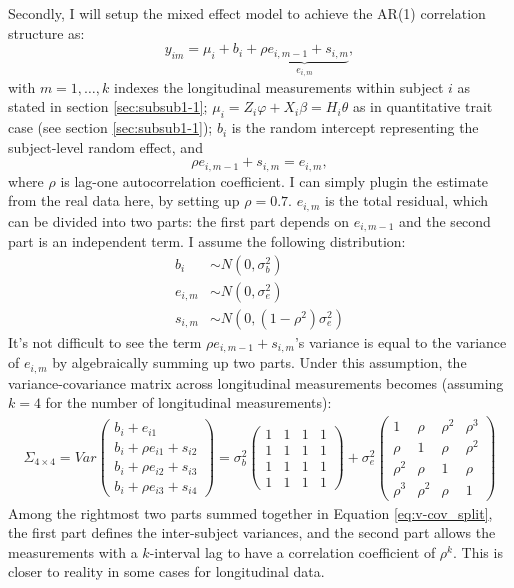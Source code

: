 \documentclass[12pt]{article}
\begin{document}
Secondly, I will setup the mixed effect model to achieve the AR(1) correlation structure as:\\
\begin{equation}
y_{im} = \mu_{i} + b_i + \underbrace{ \rho e_{i,m-1} + s_{i,m} }_{ e_{i,m} }  ,
\label{eq:y_im_split}
\end{equation}
with $m = 1,\ldots,k$ indexes the longitudinal measurements within subject $i$ as stated in section \ref{sec:subsub1-1}; $\mu_{i} = Z_i \varphi + X_i \beta = H_i \theta$ as in quantitative trait case (see section \ref{sec:subsub1-1}); $b_i$ is the random intercept representing the subject-level random effect, and
$$
\rho e_{i,m-1} + s_{i,m} = e_{i,m},
$$ 
where $\rho$ is lag-one autocorrelation coefficient. I can simply plugin the estimate from the real data here, by setting up $\rho = 0.7$. $e_{i,m}$ is the total residual, which can be divided into two parts: the first part depends on $e_{i,m-1}$ and the second part is an independent term. I assume the following distribution:\\
\begin{align*}
b_i & \sim N(0,\sigma_b^2)\\
e_{i,m} & \sim  N(0, \sigma_e^2)\\
s_{i,m} & \sim  N(0, (1 - \rho^2) \sigma_e^2 )
\end{align*}
It's not difficult to see the term $\rho e_{i,m-1} + s_{i,m}$'s variance is equal to the variance of $e_{i,m}$ by algebraically summing up two parts. Under this assumption, the variance-covariance matrix across longitudinal measurements becomes (assuming $k = 4$ for the number of longitudinal measurements):
\begin{eqnarray}
\Sigma_{4\times 4} = Var 
\begin{pmatrix}
b_i + e_{i1}\\
b_i + \rho e_{i1} + s_{i2}\\
b_i + \rho e_{i2} + s_{i3}\\
b_i + \rho e_{i3} + s_{i4}
\end{pmatrix}
= \sigma_b^2
\begin{pmatrix}
1 & 1 & 1 & 1\\
1 & 1 & 1 & 1\\
1 & 1 & 1 & 1\\
1 & 1 & 1 & 1
\end{pmatrix}
+ \sigma_e^2 
\begin{pmatrix}
1 & \rho & \rho^2 & \rho^3 \\
\rho & 1 & \rho & \rho^2 \\
\rho^2 & \rho & 1 & \rho \\
\rho^3 & \rho^2 & \rho & 1
\end{pmatrix}
\label{eq:v-cov_split}
\end{eqnarray}
Among the rightmost two parts summed together in Equation \eqref{eq:v-cov_split}, the first part defines the inter-subject variances, and the second part allows the measurements with a $k$-interval lag to have a correlation coefficient of $\rho ^ k$. This is closer to reality in some cases for longitudinal data.
\end{document}
